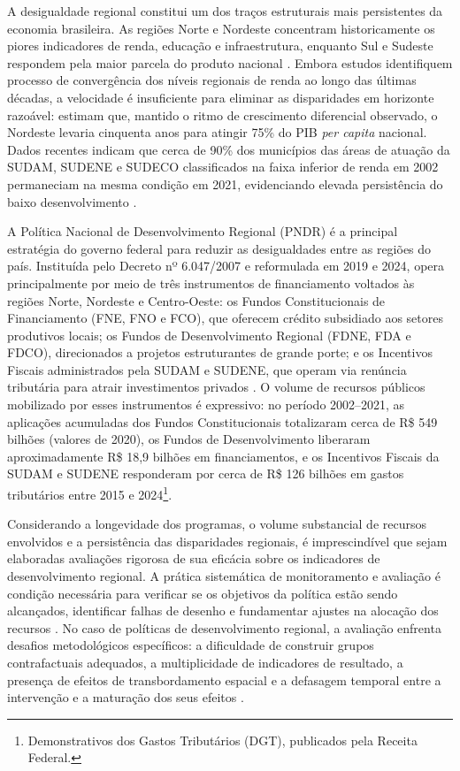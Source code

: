 
A desigualdade regional constitui um dos traços estruturais mais persistentes da economia brasileira. As regiões Norte e Nordeste concentram historicamente os piores indicadores de renda, educação e infraestrutura, enquanto Sul e Sudeste respondem pela maior parcela do produto nacional \cite{Ferreira1995,Silveira2011}. Embora estudos identifiquem processo de convergência dos níveis regionais de renda ao longo das últimas décadas, a velocidade é insuficiente para eliminar as disparidades em horizonte razoável:  estimam que, mantido o ritmo de crescimento diferencial observado, o Nordeste levaria cinquenta anos para atingir 75\% do PIB \textit{per capita} nacional. Dados recentes indicam que cerca de 90\% dos municípios das áreas de atuação da SUDAM, SUDENE e SUDECO classificados na faixa inferior de renda em 2002 permaneciam na mesma condição em 2021, evidenciando elevada persistência do baixo desenvolvimento \cite{Souza2025}.

A Política Nacional de Desenvolvimento Regional (PNDR) é a principal estratégia do governo federal para reduzir as desigualdades entre as regiões do país. Instituída pelo Decreto nº 6.047/2007 e reformulada em 2019 e 2024, opera principalmente por meio de três instrumentos de financiamento voltados às regiões Norte, Nordeste e Centro-Oeste: os Fundos Constitucionais de Financiamento (FNE, FNO e FCO), que oferecem crédito subsidiado aos setores produtivos locais; os Fundos de Desenvolvimento Regional (FDNE, FDA e FDCO), direcionados a projetos estruturantes de grande porte; e os Incentivos Fiscais administrados pela SUDAM e SUDENE, que operam via renúncia tributária para atrair investimentos privados \cite{Portugal2020}. O volume de recursos públicos mobilizado por esses instrumentos é expressivo: no período 2002--2021, as aplicações acumuladas dos Fundos Constitucionais totalizaram cerca de R\$ 549 bilhões (valores de 2020), os Fundos de Desenvolvimento liberaram aproximadamente R\$ 18,9 bilhões em financiamentos, e os Incentivos Fiscais da SUDAM e SUDENE responderam por cerca de R\$ 126 bilhões em gastos tributários entre 2015 e 2024\footnote{Demonstrativos dos Gastos Tributários (DGT), publicados pela Receita Federal.}.

Considerando a longevidade dos programas, o volume substancial de recursos envolvidos e a persistência das disparidades regionais, é imprescindível que sejam elaboradas avaliações rigorosa de sua eficácia sobre os indicadores de desenvolvimento regional. A prática sistemática de monitoramento e avaliação é condição necessária para verificar se os objetivos da política estão sendo alcançados, identificar falhas de desenho e fundamentar ajustes na alocação dos recursos \cite{Lima2025}. No caso de políticas de desenvolvimento regional, a avaliação enfrenta desafios metodológicos específicos: a dificuldade de construir grupos contrafactuais adequados, a multiplicidade de indicadores de resultado, a presença de efeitos de transbordamento espacial e a defasagem temporal entre a intervenção e a maturação dos seus efeitos \cite{Oecd2025}.

